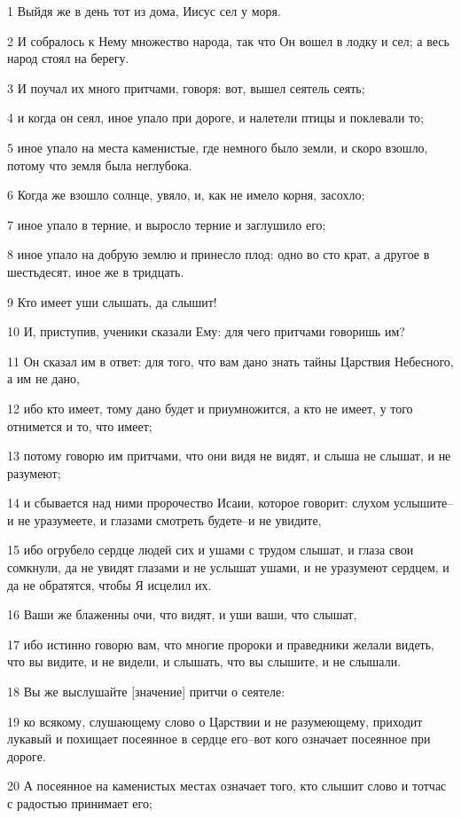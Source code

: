 \par 1 Выйдя же в день тот из дома, Иисус сел у моря.
\par 2 И собралось к Нему множество народа, так что Он вошел в лодку и сел; а весь народ стоял на берегу.
\par 3 И поучал их много притчами, говоря: вот, вышел сеятель сеять;
\par 4 и когда он сеял, иное упало при дороге, и налетели птицы и поклевали то;
\par 5 иное упало на места каменистые, где немного было земли, и скоро взошло, потому что земля была неглубока.
\par 6 Когда же взошло солнце, увяло, и, как не имело корня, засохло;
\par 7 иное упало в терние, и выросло терние и заглушило его;
\par 8 иное упало на добрую землю и принесло плод: одно во сто крат, а другое в шестьдесят, иное же в тридцать.
\par 9 Кто имеет уши слышать, да слышит!
\par 10 И, приступив, ученики сказали Ему: для чего притчами говоришь им?
\par 11 Он сказал им в ответ: для того, что вам дано знать тайны Царствия Небесного, а им не дано,
\par 12 ибо кто имеет, тому дано будет и приумножится, а кто не имеет, у того отнимется и то, что имеет;
\par 13 потому говорю им притчами, что они видя не видят, и слыша не слышат, и не разумеют;
\par 14 и сбывается над ними пророчество Исаии, которое говорит: слухом услышите--и не уразумеете, и глазами смотреть будете--и не увидите,
\par 15 ибо огрубело сердце людей сих и ушами с трудом слышат, и глаза свои сомкнули, да не увидят глазами и не услышат ушами, и не уразумеют сердцем, и да не обратятся, чтобы Я исцелил их.
\par 16 Ваши же блаженны очи, что видят, и уши ваши, что слышат,
\par 17 ибо истинно говорю вам, что многие пророки и праведники желали видеть, что вы видите, и не видели, и слышать, что вы слышите, и не слышали.
\par 18 Вы же выслушайте [значение] притчи о сеятеле:
\par 19 ко всякому, слушающему слово о Царствии и не разумеющему, приходит лукавый и похищает посеянное в сердце его--вот кого означает посеянное при дороге.
\par 20 А посеянное на каменистых местах означает того, кто слышит слово и тотчас с радостью принимает его;
